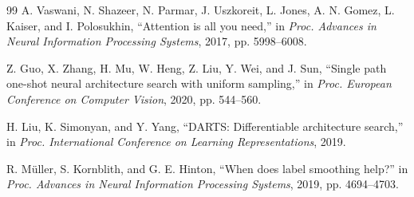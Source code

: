 \documentclass[journal]{IEEEtran}
\begin{document}
\begin{thebibliography}{99}
A. Vaswani, N. Shazeer, N. Parmar, J. Uszkoreit, L. Jones, A. N. Gomez, L. Kaiser, and I. Polosukhin, ``Attention is all you need,'' in \emph{Proc. Advances in Neural Information Processing Systems}, 2017, pp. 5998--6008.

Z. Guo, X. Zhang, H. Mu, W. Heng, Z. Liu, Y. Wei, and J. Sun, ``Single path one-shot neural architecture search with uniform sampling,'' in \emph{Proc. European Conference on Computer Vision}, 2020, pp. 544--560.

H. Liu, K. Simonyan, and Y. Yang, ``DARTS: Differentiable architecture search,'' in \emph{Proc. International Conference on Learning Representations}, 2019.

R. M\"uller, S. Kornblith, and G. E. Hinton, ``When does label smoothing help?'' in \emph{Proc. Advances in Neural Information Processing Systems}, 2019, pp. 4694--4703.

\end{thebibliography}
\end{document}
